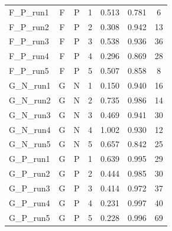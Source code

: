 \begin{table}[t]
\begin{tabular}{lcccccc}
F\_P\_run1 & F & P & 1 & 0.513 & 0.781 & 6 \\
F\_P\_run2 & F & P & 2 & 0.308 & 0.942 & 13 \\
F\_P\_run3 & F & P & 3 & 0.538 & 0.936 & 36 \\
F\_P\_run4 & F & P & 4 & 0.296 & 0.869 & 28 \\
F\_P\_run5 & F & P & 5 & 0.507 & 0.858 & 8 \\
G\_N\_run1 & G & N & 1 & 0.150 & 0.940 & 16 \\
G\_N\_run2 & G & N & 2 & 0.735 & 0.986 & 14 \\
G\_N\_run3 & G & N & 3 & 0.469 & 0.941 & 30 \\
G\_N\_run4 & G & N & 4 & 1.002 & 0.930 & 12 \\
G\_N\_run5 & G & N & 5 & 0.657 & 0.842 & 25 \\
G\_P\_run1 & G & P & 1 & 0.639 & 0.995 & 29 \\
G\_P\_run2 & G & P & 2 & 0.444 & 0.985 & 30 \\
G\_P\_run3 & G & P & 3 & 0.414 & 0.972 & 37 \\
G\_P\_run4 & G & P & 4 & 0.231 & 0.997 & 40 \\
G\_P\_run5 & G & P & 5 & 0.228 & 0.996 & 69 \\
\bottomrule
\end{tabular}
\end{table}
